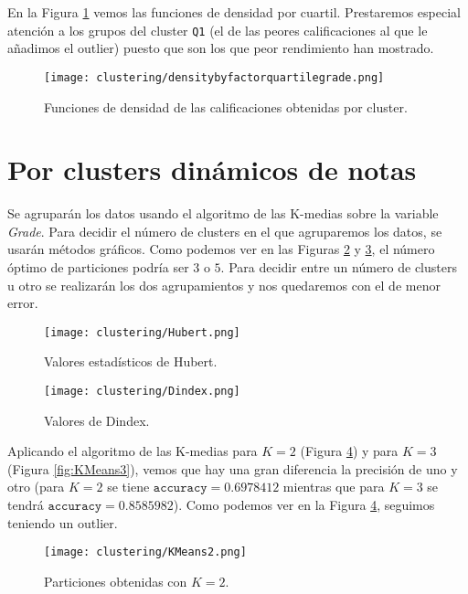 En la Figura \ref{fig:densitybyfactorquartilegrade} vemos las funciones de densidad por cuartil. Prestaremos especial atención a los grupos del cluster \texttt{Q1} (el de las peores calificaciones al que le añadimos el outlier) puesto que son los que peor rendimiento han mostrado.

\begin{figure}[H]
    \centering
    \texttt{[image: clustering/densitybyfactorquartilegrade.png]}
    \caption{Funciones de densidad de las calificaciones obtenidas por cluster.}
    \label{fig:densitybyfactorquartilegrade}
\end{figure}

\section{Por clusters dinámicos de notas}

Se agruparán los datos usando el algoritmo de las K-medias sobre la variable \emph{Grade}. Para decidir el número de clusters en el que agruparemos los datos, se usarán métodos gráficos. Como podemos ver en las Figuras \ref{fig:indiceshubert} y \ref{fig:indicesdindex}, el número óptimo de particiones podría ser $3$ o $5$. Para decidir entre un número de clusters u otro se realizarán los dos agrupamientos y nos quedaremos con el de menor error.

\begin{figure}[H]
    \centering
    \texttt{[image: clustering/Hubert.png]}
    \caption{Valores estadísticos de Hubert.}
    \label{fig:indiceshubert}
\end{figure}

\begin{figure}[H]
    \centering
    \texttt{[image: clustering/Dindex.png]}
    \caption{Valores de Dindex.}
    \label{fig:indicesdindex}
\end{figure}

Aplicando el algoritmo de las K-medias para $K = 2$ (Figura \ref{fig:KMeans2}) y para $K = 3$ (Figura \ref{fig:KMeans3}), vemos que hay una gran diferencia la precisión de uno y otro (para $K = 2$ se tiene $\texttt{accuracy} = 0.6978412$ mientras que para $K = 3$ se tendrá $\texttt{accuracy} = 0.8585982$). Como podemos ver en la Figura \ref{fig:KMeans2}, seguimos teniendo un outlier.

\begin{figure}[H]
    \centering
    \texttt{[image: clustering/KMeans2.png]}
    \caption{Particiones obtenidas con $K = 2$.}
    \label{fig:KMeans2}
\end{figure}

